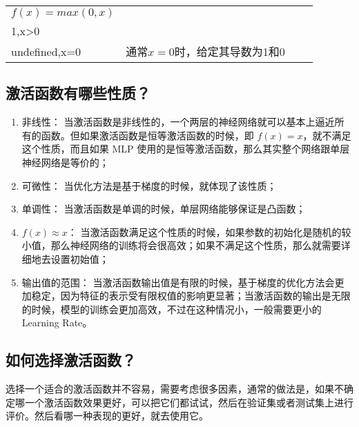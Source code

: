 \begin{longtable}[]{ llll }
\begin{minipage}[t]{0.22\columnwidth}
\(f(x)=max(0,x)\)\strut
\end{minipage} & \begin{minipage}[t]{0.30\columnwidth}\raggedright\strut
\(c(u)=\begin{cases} 0,x<0 \\ 1,x>0 \\ undefined,x=0\end{cases}\)\strut
\end{minipage} & \begin{minipage}[t]{0.30\columnwidth}\raggedright\strut
通常\(x=0\)时，给定其导数为1和0\strut
\end{minipage}\tabularnewline
\bottomrule
\end{longtable}

\subsection{激活函数有哪些性质？}\label{ux6fc0ux6d3bux51fdux6570ux6709ux54eaux4e9bux6027ux8d28}

\begin{enumerate}
\def\labelenumi{\arabic{enumi}.}
 
\item
  非线性：
  当激活函数是非线性的，一个两层的神经网络就可以基本上逼近所有的函数。但如果激活函数是恒等激活函数的时候，即
  $ f(x)=x $，就不满足这个性质，而且如果 MLP
  使用的是恒等激活函数，那么其实整个网络跟单层神经网络是等价的；
\item
  可微性： 当优化方法是基于梯度的时候，就体现了该性质；
\item
  单调性： 当激活函数是单调的时候，单层网络能够保证是凸函数；
\item
  $ f(x)≈x $：
  当激活函数满足这个性质的时候，如果参数的初始化是随机的较小值，那么神经网络的训练将会很高效；如果不满足这个性质，那么就需要详细地去设置初始值；
\item
  输出值的范围：
  当激活函数输出值是有限的时候，基于梯度的优化方法会更加稳定，因为特征的表示受有限权值的影响更显著；当激活函数的输出是无限的时候，模型的训练会更加高效，不过在这种情况小，一般需要更小的
  Learning Rate。
\end{enumerate}

\subsection{如何选择激活函数？}\label{ux5982ux4f55ux9009ux62e9ux6fc0ux6d3bux51fdux6570}

​
选择一个适合的激活函数并不容易，需要考虑很多因素，通常的做法是，如果不确定哪一个激活函数效果更好，可以把它们都试试，然后在验证集或者测试集上进行评价。然后看哪一种表现的更好，就去使用它。

